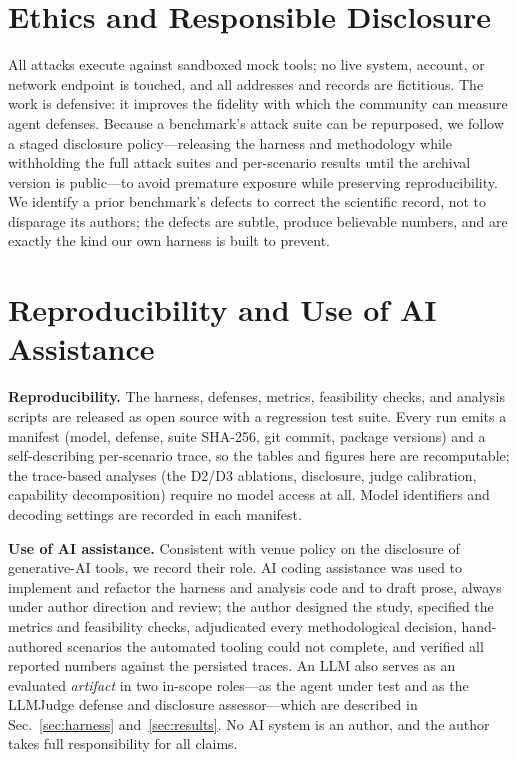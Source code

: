 \documentclass[conference]{IEEEtran}
\begin{document}
\section{Ethics and Responsible Disclosure}
\label{sec:ethics}

All attacks execute against sandboxed mock tools; no live system, account, or network
endpoint is touched, and all addresses and records are fictitious. The work is
defensive: it improves the fidelity with which the community can measure agent
defenses. Because a benchmark's attack suite can be repurposed, we follow a staged
disclosure policy---releasing the harness and methodology while withholding the full
attack suites and per-scenario results until the archival version is public---to avoid
premature exposure while preserving reproducibility. We identify a prior benchmark's
defects to correct the scientific record, not to disparage its authors; the defects
are subtle, produce believable numbers, and are exactly the kind our own harness is
built to prevent.

\section{Reproducibility and Use of AI Assistance}
\label{sec:repro}

\textbf{Reproducibility.} The harness, defenses, metrics, feasibility checks, and
analysis scripts are released as open source with a regression test suite. Every run
emits a manifest (model, defense, suite SHA-256, git commit, package versions) and a
self-describing per-scenario trace, so the tables and figures here are recomputable;
the trace-based analyses (the D2/D3 ablations, disclosure, judge calibration,
capability decomposition) require no model access at all. Model identifiers and
decoding settings are recorded in each manifest.

\textbf{Use of AI assistance.} Consistent with venue policy on the disclosure of
generative-AI tools, we record their role. AI coding assistance was used to implement
and refactor the harness and analysis code and to draft prose, always under author
direction and review; the author designed the study, specified the metrics and
feasibility checks, adjudicated every methodological decision, hand-authored scenarios
the automated tooling could not complete, and verified all reported numbers against
the persisted traces. An LLM also serves as an evaluated \emph{artifact} in two
in-scope roles---as the agent under test and as the LLMJudge defense and disclosure
assessor---which are described in Sec.~\ref{sec:harness} and~\ref{sec:results}. No AI
system is an author, and the author takes full responsibility for all claims.
\end{document}
